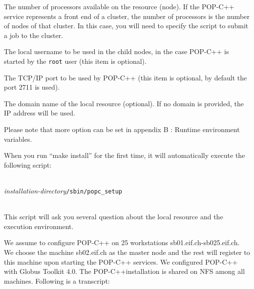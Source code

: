 \begin{petitem}
\item The number of processors available on the resource (node).
If the POP-C++ service represents a
front end of a cluster, the number of processors is the number of nodes
of that cluster. In this case, you will need to specify the script to
submit a job to the cluster.  

\item The local username to be used in the child nodes, in the case
POP-C++ is started by the \texttt{root} user (this item is optional).

\item The TCP/IP port to be used by POP-C++ (this item is optional, by
default the port 2711 is used).

\item The domain name of the local resource (optional). If no domain is
provided, the IP address will be used. 


Please note that more option can be set in appendix B : Runtime environment
variables.


\end{petitem}


When you run ``make install'' for the first time, it will automatically execute the following script:

 \textit{~\\
installation-directory}\texttt{/sbin/popc\_setup}\\
~

This script will ask you several question about the local resource and the execution environment. 


We assume to configure POP-C++ on 25 workstations sb01.eif.ch-sb025.eif.ch. We choose the machine sb02.eif.ch as the master node and the rest will register to this machine upon starting the POP-C++ services. We configured POP-C++ with Globus Toolkit 4.0. The POP-C++installation is shared on NFS among all machines.  Following is a transcript:



